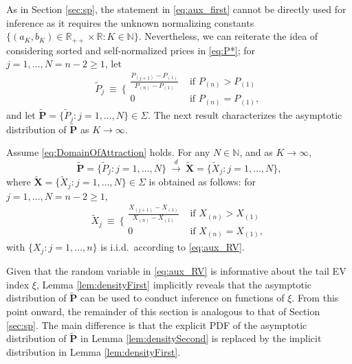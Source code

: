 As in Section \ref{sec:sp}, the statement in \eqref{eq:aux_first} cannot be directly used for inference as it requires the unknown normalizing constants $\{(a_{K},b_{K})\in \mathbb{R}_{++}\times \mathbb{R}:K\in \mathbb{N}\}$. Nevertheless, we can reiterate the idea of considering sorted and self-normalized prices in \eqref{eq:P*}; for $j=1,\dots,N = n-2\geq 1$, let
\begin{equation}
\tilde{P}_{j}~\equiv ~\bigg\{
\begin{array}{cc}
     \frac{P_{(j+1)}-P_{(1)}}{P_{(n)}-P_{(1)}}&\text{ if }P_{(n)} > P_{(1)}  \\
    0&\text{ if }P_{(n)} = P_{(1)} , 
\end{array}
    \label{eq:P*fp}
\end{equation}
and let $\mathbf{\tilde{P}}=\{ \tilde{P}_{j}:j=1,\dots,N\} \in \Sigma$. The next result characterizes the asymptotic distribution of $\mathbf{\tilde{P}}$ as $K \to \infty$.

\begin{lemma}\label{lem:densityFirst}
Assume \eqref{eq:DomainOfAttraction} holds. For any $ N\in \mathbb{N}$, and as $K\to \infty $, 
\begin{equation}
\mathbf{\tilde{P}}=\{\tilde{P}_{j}:j=1,\dots ,N\}~\overset{d}{\to }~\mathbf{\tilde{X}}=\{\tilde{X}_{j}:j=1,\dots ,N\},  \label{eq:P*joint_fp}
\end{equation}
where $\mathbf{\tilde{X}}=\{\tilde{X}_{j}:j=1,\dots ,N\}\in \Sigma $ is obtained as follows: for $j=1,\dots ,N = n-2\geq 1$, 
\begin{equation}
\tilde{X}_{j}~\equiv ~\bigg\{ 
\begin{array}{cc}
\frac{X_{(j+1)}-X_{(1)}}{X_{(n)}-X_{(1)}} & \text{ if }X_{(n)}>X_{(1)} \\ 
0 & \text{ if }X_{(n)}=X_{(1)},
\end{array}
 \label{eq:Xtilde}
\end{equation}
with $\{ X_{j}:j=1,\dots ,n\}$ is i.i.d.\ according to \eqref{eq:aux_RV}.
\end{lemma}

Given that the random variable in \eqref{eq:aux_RV} is informative about the tail EV index $\xi $, Lemma \ref{lem:densityFirst} implicitly reveals that the asymptotic distribution of $\mathbf{\tilde{P}}$ can be used to conduct inference on functions of $\xi $. From this point onward, the remainder of this section is analogous to that of Section \ref{sec:sp}. The main difference is that the explicit PDF of the asymptotic distribution of $\mathbf{\tilde{P}}$ in Lemma \ref{lem:densitySecond} is replaced by the implicit distribution in Lemma \ref{lem:densityFirst}. 

